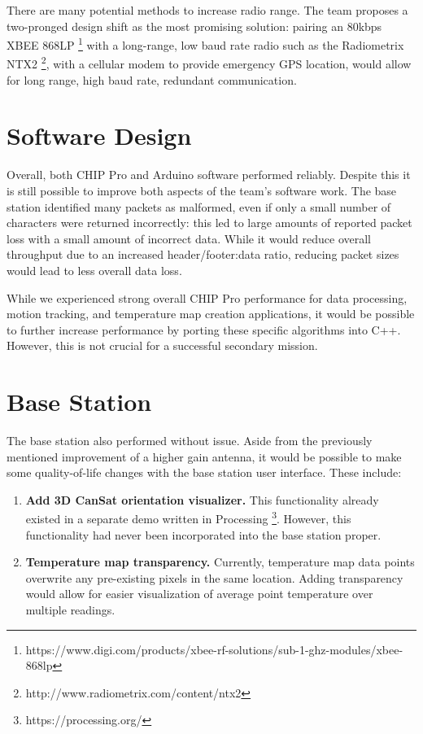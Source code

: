 \documentclass[]{report}
\begin{document}
	There are many potential methods to increase radio range. The team proposes a two-pronged design shift as the most promising solution: pairing an 80kbps XBEE 868LP \footnote{https://www.digi.com/products/xbee-rf-solutions/sub-1-ghz-modules/xbee-868lp} with a long-range, low baud rate radio such as the Radiometrix NTX2 \footnote{http://www.radiometrix.com/content/ntx2}, with a cellular modem to provide emergency GPS location, would allow for long range, high baud rate, redundant communication.
	
	\section{Software Design}
	
	Overall, both CHIP Pro and Arduino software performed reliably. Despite this it is still possible to improve both aspects of the team's software work. The base station identified many packets as malformed, even if only a small number of characters were returned incorrectly: this led to large amounts of reported packet loss with a small amount of incorrect data. While it would reduce overall throughput due to an increased header/footer:data ratio, reducing packet sizes would lead to less overall data loss.
	
	While we experienced strong overall CHIP Pro performance for data processing, motion tracking, and temperature map creation applications, it would be possible to further increase performance by porting these specific algorithms into C++. However, this is not crucial for a successful secondary mission.
	
	\section{Base Station}
	
	The base station also performed without issue. Aside from the previously mentioned improvement of a higher gain antenna, it would be possible to make some quality-of-life changes with the base station user interface. These include:
	
	\begin{enumerate}
		\item \textbf{Add 3D CanSat orientation visualizer.} This functionality already existed in a separate demo written in Processing \footnote{https://processing.org/}. However, this functionality had never been incorporated into the base station proper. \\
		\item \textbf{Temperature map transparency.} Currently, temperature map data points overwrite any pre-existing pixels in the same location. Adding transparency would allow for easier visualization of average point temperature over multiple readings.
	\end{enumerate}
	
\end{document}
